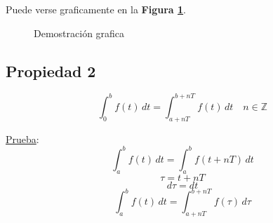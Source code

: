 Puede verse graficamente en la \textbf{Figura \ref{figura_02}}.

\begin{figure}
    \centering
    
    \caption{Demostración grafica}
    \label{figura_02}
\end{figure}

\subsection{Propiedad 2}

\begin{equation}
    \int_0^b f(t)\,dt = \int_{a+nT}^{b+nT} f(t)\,dt \quad n \in \mathbb{Z}
\end{equation}

\underline{Prueba}:
\begin{equation*}
    \int_a^b f(t)\,dt = \int_{a}^{b} f(t+nT)\,dt
\end{equation*}
\begin{equation*}
    \tau = t + nT
\end{equation*}
\begin{equation*}
    d\tau = dt
\end{equation*}
\begin{equation*}
    \int_a^b f(t)\,dt = \int_{a+nT}^{b+nT} f(\tau)\,d\tau
\end{equation*}

